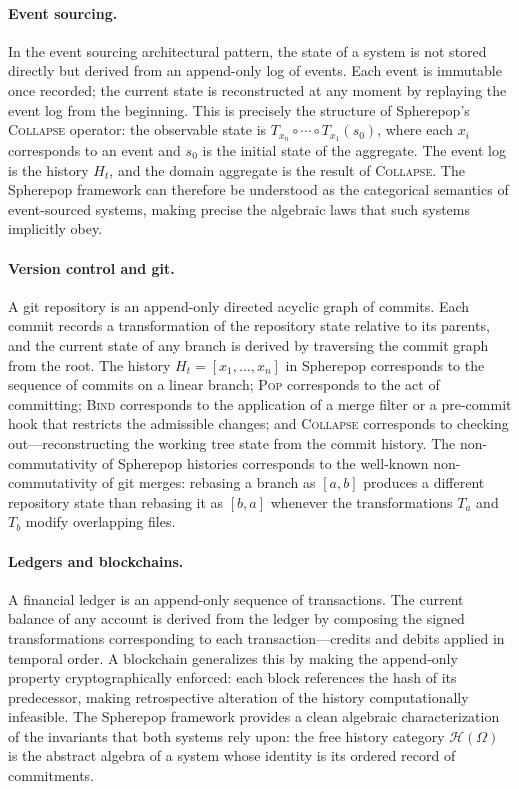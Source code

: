 \documentclass[12pt]{article}
\begin{document}
\paragraph{Event sourcing.} In the event sourcing architectural pattern, the state of a system is not stored directly but derived from an append-only log of events. Each event is immutable once recorded; the current state is reconstructed at any moment by replaying the event log from the beginning. This is precisely the structure of Spherepop's \textsc{Collapse} operator: the observable state is $T_{x_n} \circ \cdots \circ T_{x_1}(s_0)$, where each $x_i$ corresponds to an event and $s_0$ is the initial state of the aggregate. The event log is the history $H_t$, and the domain aggregate is the result of \textsc{Collapse}. The Spherepop framework can therefore be understood as the categorical semantics of event-sourced systems, making precise the algebraic laws that such systems implicitly obey.

\paragraph{Version control and git.} A git repository is an append-only directed acyclic graph of commits. Each commit records a transformation of the repository state relative to its parents, and the current state of any branch is derived by traversing the commit graph from the root. The history $H_t = [x_1, \ldots, x_n]$ in Spherepop corresponds to the sequence of commits on a linear branch; \textsc{Pop} corresponds to the act of committing; \textsc{Bind} corresponds to the application of a merge filter or a pre-commit hook that restricts the admissible changes; and \textsc{Collapse} corresponds to checking out---reconstructing the working tree state from the commit history. The non-commutativity of Spherepop histories corresponds to the well-known non-commutativity of git merges: rebasing a branch as $[a, b]$ produces a different repository state than rebasing it as $[b, a]$ whenever the transformations $T_a$ and $T_b$ modify overlapping files.

\paragraph{Ledgers and blockchains.} A financial ledger is an append-only sequence of transactions. The current balance of any account is derived from the ledger by composing the signed transformations corresponding to each transaction---credits and debits applied in temporal order. A blockchain generalizes this by making the append-only property cryptographically enforced: each block references the hash of its predecessor, making retrospective alteration of the history computationally infeasible. The Spherepop framework provides a clean algebraic characterization of the invariants that both systems rely upon: the free history category $\mathcal{H}(\Omega)$ is the abstract algebra of a system whose identity is its ordered record of commitments.
\end{document}
